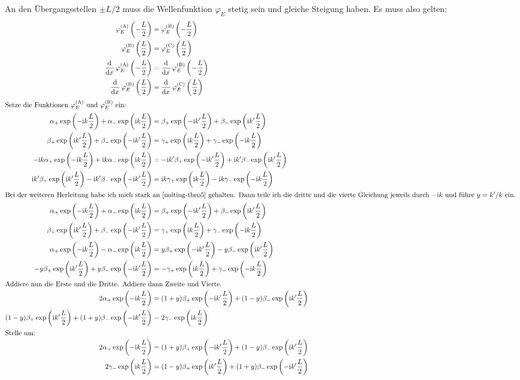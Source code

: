 An den Übergangsstellen $\pm L/2$ muss die Wellenfunktion $\varphi_E$ stetig
sein und gleiche Steigung haben.  Es muss also gelten:
\begin{align*}
	\phiA\del{-\frac L2} &= \phiB\del{-\frac L2} \\
	\phiB\del{\frac L2} &= \phiC\del{\frac L2} \\
	\dod{}x \phiA\del{-\frac L2} &= \dod{}x \phiB\del{-\frac L2} \\
	\dod{}x \phiB\del{\frac L2} &= \dod{}x \phiC\del{\frac L2} \\
	\intertext{%
		Setze die Funktionen $\phiA$ und $\phiB$ ein:
	}
	\alpha_+ \exp\del{- \ii k \frac L2} + \alpha_- \exp\del{\ii k \frac L2}
	&= \beta_+ \exp\del{- \ii k' \frac L2} + \beta_- \exp\del{\ii k' \frac L2} \\
	\beta_+ \exp\del{\ii k' \frac L2} + \beta_- \exp\del{- \ii k' \frac L2}
	&= \gamma_+ \exp\del{\ii k \frac L2} + \gamma_- \exp\del{- \ii k \frac L2} \\
	-\ii k \alpha_+ \exp\del{- \ii k \frac L2} + \ii k \alpha_- \exp\del{\ii k \frac L2}
	&= -\ii k' \beta_+ \exp\del{- \ii k' \frac L2} + \ii k' \beta_- \exp\del{\ii k' \frac L2} \\
	\ii k' \beta_+ \exp\del{\ii k' \frac L2} - \ii k' \beta_- \exp\del{- \ii k' \frac L2}
	&= \ii k \gamma_+ \exp\del{\ii k \frac L2} - \ii k \gamma_- \exp\del{- \ii k \frac L2} \\
	\intertext{%
		Bei der weiteren Herleitung habe ich mich stark an \cite[Seite
		269]{nolting-theo5} gehalten. Dann teile ich die dritte und die vierte
		Gleichung jeweils durch $- \ii k$ und führe $y = k'/k$ ein.
	}
	\alpha_+ \exp\del{- \ii k \frac L2} + \alpha_- \exp\del{\ii k \frac L2}
	&= \beta_+ \exp\del{- \ii k' \frac L2} + \beta_- \exp\del{\ii k' \frac L2} \\
	\beta_+ \exp\del{\ii k' \frac L2} + \beta_- \exp\del{- \ii k' \frac L2}
	&= \gamma_+ \exp\del{\ii k \frac L2} + \gamma_- \exp\del{- \ii k \frac L2} \\
	\alpha_+ \exp\del{- \ii k \frac L2} - \alpha_- \exp\del{\ii k \frac L2}
	&= y \beta_+ \exp\del{- \ii k' \frac L2} -y \beta_- \exp\del{\ii k' \frac L2} \\
	- y\beta_+ \exp\del{\ii k' \frac L2} + y\beta_- \exp\del{- \ii k' \frac L2}
	&= - \gamma_+ \exp\del{\ii k \frac L2} +  \gamma_- \exp\del{- \ii k \frac L2} \\
	\intertext{%
		Addiere nun die Erste und die Dritte. Addiere dann Zweite und Vierte.
	}
	2 \alpha_+ \exp\del{- \ii k \frac L2}
	&= (1+y) \beta_+ \exp\del{- \ii k' \frac L2} + (1-y) \beta_- \exp\del{\ii k' \frac L2} \\
	(1-y) \beta_+ \exp\del{\ii k' \frac L2} + (1+y) \beta_- \exp\del{- \ii k' \frac L2}
	&= 2 \gamma_- \exp\del{\ii k \frac L2} \\
	\intertext{%
		Stelle um:
	}
	2 \alpha_+ \exp\del{- \ii k \frac L2}
	&= (1+y) \beta_+ \exp\del{- \ii k' \frac L2} + (1-y) \beta_- \exp\del{\ii k' \frac L2} \\
	2 \gamma_- \exp\del{\ii k \frac L2}
	&= (1-y) \beta_+ \exp\del{\ii k' \frac L2} + (1+y) \beta_- \exp\del{- \ii k' \frac L2} \\
\end{align*}

